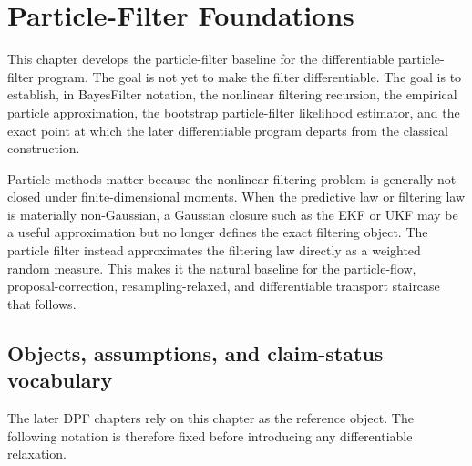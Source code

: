 \chapter{Particle-Filter Foundations}
\label{ch:bf-particle-filters}

This chapter develops the particle-filter baseline for the differentiable
particle-filter program.  The goal is not yet to make the filter
differentiable.  The goal is to establish, in BayesFilter notation, the
nonlinear filtering recursion, the empirical particle approximation, the
bootstrap particle-filter likelihood estimator, and the exact point at which the
later differentiable program departs from the classical construction.

Particle methods matter because the nonlinear filtering problem is generally not
closed under finite-dimensional moments.  When the predictive law or filtering
law is materially non-Gaussian, a Gaussian closure such as the EKF or UKF may be
a useful approximation but no longer defines the exact filtering object.  The
particle filter instead approximates the filtering law directly as a weighted
random measure.  This makes it the natural baseline for the particle-flow,
proposal-correction, resampling-relaxed, and differentiable transport staircase
that follows.

\section{Objects, assumptions, and claim-status vocabulary}
\label{sec:bf-pf-objects}

The later DPF chapters rely on this chapter as the reference object.  The
following notation is therefore fixed before introducing any differentiable
relaxation.

